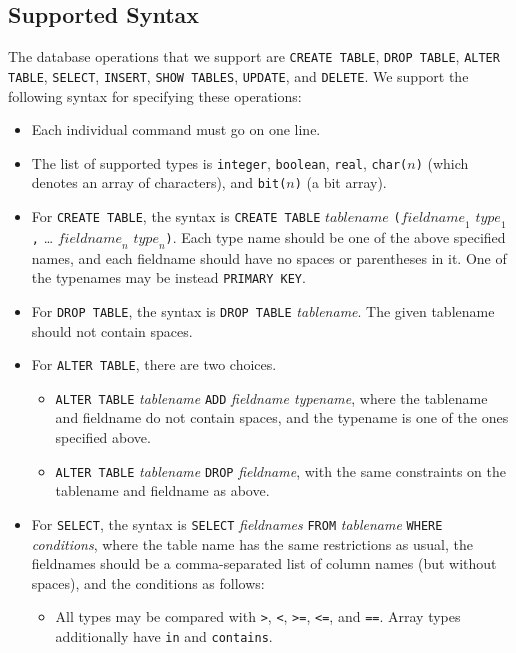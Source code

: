 \documentclass[10pt]{article}
\begin{document}
\begin{multicols}{2}
\subsection{Supported Syntax}
\label{simplifying_parsing_assumptions}
The database operations that we support are \texttt{CREATE TABLE}, \texttt{DROP TABLE}, \texttt{ALTER TABLE}, \texttt{SELECT}, \texttt{INSERT}, \texttt{SHOW TABLES}, \texttt{UPDATE}, and \texttt{DELETE}.  We support the following syntax for specifying these operations:
\begin{itemize}
	\item Each individual command must go on one line.
	\item The list of supported types is \verb+integer+, \verb+boolean+, \verb+real+, \verb+char(+$n$\verb+)+ (which denotes an array of characters), and \verb+bit(+$n$\verb+)+ (a bit array).
	\item For \texttt{CREATE TABLE}, the syntax is \texttt{CREATE TABLE} $\mathit{tablename}$ \verb+(+$\mathit{fieldname}_1$ $\mathit{type}_1$\verb+,+ \dots{} $\mathit{fieldname}_n$ $\mathit{type}_n$\verb+)+. Each type name should be one of the above specified names, and each fieldname should have no spaces or parentheses in it. One of the typenames may be instead \texttt{PRIMARY KEY}.
	\item For \texttt{DROP TABLE}, the syntax is \verb+DROP TABLE+ \textit{tablename}. The given tablename should not contain spaces.
	\item For \texttt{ALTER TABLE}, there are two choices.
	\begin{itemize}
		\item \texttt{ALTER TABLE} \textit{tablename} \texttt{ADD} \textit{fieldname typename}, where the tablename and fieldname do not contain spaces, and the typename is one of the ones specified above.
		\item \texttt{ALTER TABLE} \textit{tablename} \texttt{DROP} \textit{fieldname}, with the same constraints on the tablename and fieldname as above.
	\end{itemize}
	\item For \texttt{SELECT}, the syntax is \texttt{SELECT} \textit{fieldnames} \texttt{FROM} \textit{tablename} \texttt{WHERE} \textit{conditions}, where the table name has the same restrictions as usual, the fieldnames should be a comma-separated list of column names (but without spaces), and the conditions as follows:
	\begin{itemize}
		\item All types may be compared with \verb+>+, \verb+<+, \verb+>=+, \verb+<=+, and \verb+==+. Array types additionally have \verb+in+ and \verb+contains+.

\end{itemize}
\end{itemize}
\end{multicols}
\end{document}

